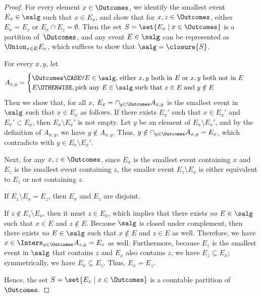 \documentclass[acmsmall,nonacm,screen,appendix]{acmart}
\begin{document}
\begin{proof}
  For every element $x \in \Outcomes$,
  we identify the smallest event $E_x \in \salg$ such that $x \in E_x$,
  and show that for $x, z \in \Outcomes$,
  either $E_x = E_z$ or $E_x \cap E_z = \emptyset$.
  Then the set $S = \set{E_x \mid x \in \Outcomes}$
  is a partition of~$\Outcomes$,
  and any event $E \in \salg$ can be represented as
  $\Union_{x \in E} E_x$, which suffices to show that $\salg = \closure{S}$.

  For every $x, y$, let
\begin{align*}
    A_{x, y} &=
    \begin{cases}
      \Outcomes \CASE \text{$\forall E \in \salg$, either $x , y$ both in~$E$ or $x , y$ both not in~$E$} \\
      E \OTHERWISE, \text{pick any $E \in \salg$ such that $x \in E$ and $y \notin E$}
    \end{cases}
  \end{align*}
Then we show that, for all $x$,
  $E_x = \cap_{y \in \Outcomes} A_{x, y}$ is the smallest
  event in $\salg$ such that $x \in E_x$ as follows.
  If there exists $E_x'$ such that $x \in E_x'$ and $E_x' \subset E_x$,
  then $E_x \setminus E_x'$ is not empty. Let $y$ be an element of
  $E_x \setminus E_x'$, and by the definition of $A_{x, y}$, we have
  $y \notin A_{x,y}$. Thus, $y \notin \cap_{y \in \Outcomes} A_{x, y} = E_x$,
  which contradicts with $y \in E_x \setminus E_x'$.

  Next, for any  $x, z \in \Outcomes$,
  since $E_x$ is the smallest event containing $x$ and
  $E_z$ is the smallest event containing $z$,
  the smaller event $E_z \setminus E_x$ is either equivalent to
  $E_z$ or not containing $z$.
  \begin{casesplit}
    \item
      If $E_z \setminus E_x = E_z$, then $E_x$ and $E_z$ are
      disjoint.
    \item If $z \not\in E_z \setminus E_x$, then it must $z \in E_x$,
      which implies that there exists \emph{no} $E \in \salg$ such that
      $x \in E$ and $z \notin E$. Because $\salg$ is closed under
      complement, then there exists \emph{no} $E \in \salg$ such that
      $x \notin E$ and $z \in E$ as well. Therefore,
      we have $x \in  \Inters_{y \in \Outcomes} A_{z, y} = E_z$ as well.
      Furthermore, because $E_z$ is the smallest event in
      $\salg$ that contains $z$ and $E_x$ also contains $z$,
      we have $E_z \subseteq E_x$; symmetrically, we have
      $E_x \subseteq E_z$.
      Thus, $E_x = E_z$.
    \end{casesplit}
    Hence,  the set $S = \set{E_x \mid x \in \Outcomes}$ is a
    countable partition of~$\Outcomes$.
\end{proof}
\end{document}
